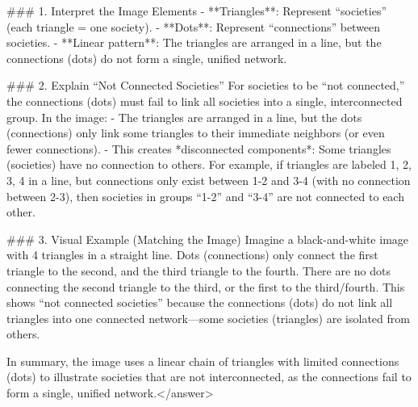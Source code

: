 ### 1. Interpret the Image Elements  
- **Triangles**: Represent “societies” (each triangle = one society).  
- **Dots**: Represent “connections” between societies.  
- **Linear pattern**: The triangles are arranged in a line, but the connections (dots) do not form a single, unified network.    

### 2. Explain “Not Connected Societies”  
For societies to be “not connected,” the connections (dots) must fail to link all societies into a single, interconnected group. In the image:  
- The triangles are arranged in a line, but the dots (connections) only link some triangles to their immediate neighbors (or even fewer connections).  
- This creates *disconnected components*: Some triangles (societies) have no connection to others. For example, if triangles are labeled 1, 2, 3, 4 in a line, but connections only exist between 1-2 and 3-4 (with no connection between 2-3), then societies in groups “1-2” and “3-4” are not connected to each other.    

### 3. Visual Example (Matching the Image)  
Imagine a black-and-white image with 4 triangles in a straight line. Dots (connections) only connect the first triangle to the second, and the third triangle to the fourth. There are no dots connecting the second triangle to the third, or the first to the third/fourth. This shows “not connected societies” because the connections (dots) do not link all triangles into one connected network—some societies (triangles) are isolated from others.    

In summary, the image uses a linear chain of triangles with limited connections (dots) to illustrate societies that are not interconnected, as the connections fail to form a single, unified network.</answer>